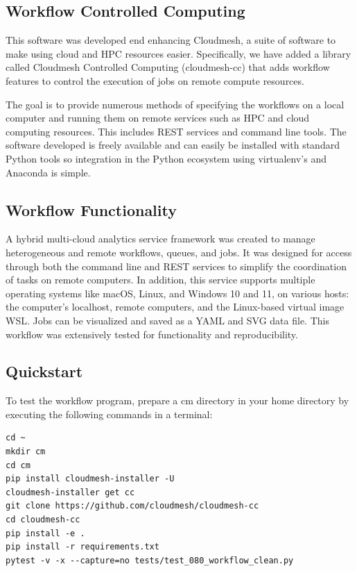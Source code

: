 \subsection{Workflow Controlled
Computing}\label{workflow-controlled-computing}

This software was developed end enhancing Cloudmesh, a suite of software
to make using cloud and HPC resources easier. Specifically, we have
added a library called Cloudmesh Controlled Computing (cloudmesh-cc)
that adds workflow features to control the execution of jobs on remote
compute resources.

The goal is to provide numerous methods of specifying the workflows on a
local computer and running them on remote services such as HPC and cloud
computing resources. This includes REST services and command line tools.
The software developed is freely available and can easily be installed
with standard Python tools so integration in the Python ecosystem using
virtualenv's and Anaconda is simple.


\subsection{Workflow Functionality}\label{workflow-functionality}

A hybrid multi-cloud analytics service framework was created to manage
heterogeneous and remote workflows, queues, and jobs. It was designed
for access through both the command line and REST services to simplify
the coordination of tasks on remote computers. In addition, this service
supports multiple operating systems like macOS, Linux, and Windows 10
and 11, on various hosts: the computer's localhost, remote computers,
and the Linux-based virtual image WSL. Jobs can be visualized and saved
as a YAML and SVG data file. This workflow was extensively tested for
functionality and reproducibility.

\subsection{Quickstart}\label{quickstart}

To test the workflow program, prepare a cm directory in your home
directory by executing the following commands in a terminal:

\begin{verbatim}
cd ~
mkdir cm
cd cm
pip install cloudmesh-installer -U
cloudmesh-installer get cc
git clone https://github.com/cloudmesh/cloudmesh-cc
cd cloudmesh-cc
pip install -e .
pip install -r requirements.txt
pytest -v -x --capture=no tests/test_080_workflow_clean.py
\end{verbatim}


